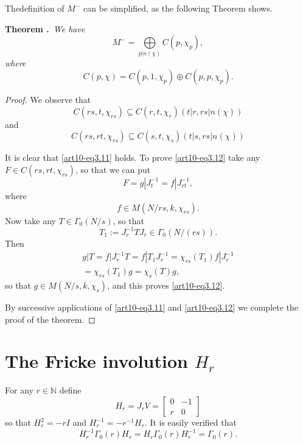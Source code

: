 The\pageoriginale definition of $M^{-}$ can be simplified, as the following Theorem shows.

\medskip
\noindent
{\bf Theorem .\label{art10-thm3.1}}~{\em We have}
\begin{equation}
M^{-}=\bigoplus\limits_{p|n(\chi)}C(p,\chi_{p}),\label{art10-eq3.9}
\end{equation}
{\em where}
\begin{equation}
C(p,\chi)=C(p,1,\chi_{p})\oplus C(p,p,\chi_{p}).\label{art10-eq3.10}
\end{equation}

\begin{proof}
We observe that
\begin{equation}
C(rs,t,\chi_{rs})\subseteq C(r,t,\chi_{r})(t|r,rs|n(\chi))\label{art10-eq3.11}
\end{equation}
and
\begin{equation}
C(rs,rt,\chi_{rs})\subseteq C(s,t,\chi_{s})(t|s,rs|n(\chi))\label{art10-eq3.12}
\end{equation}

It is clear that \eqref{art10-eq3.11} holds. To prove \eqref{art10-eq3.12} take any $F\in C(rs,rt,\chi_{rs})$, so that we can put
$$
F=g|J^{-1}_{t}=f|J^{-1}_{rt},
$$
where
$$
f\in M(N/rs,k,\chi_{rs}).
$$
Now take any $T\in\Gamma_{0}(N/s)$, so that
$$
T_{1}:=J^{-1}_{r}TJ_{r}\in \Gamma_{0}(N/(rs)).
$$
Then
\begin{gather*}
g|T=f|J^{-1}_{r}T=f|T_{1}J^{-1}_{r}=\chi_{rs}(T_{1})f|J^{-1}_{r}\\
=\chi_{rs}(T_{1})g=\chi_{s}(T)g,
\end{gather*}
so that $g\in M(N/s,k,\chi_{s})$, and this proves \eqref{art10-eq3.12}.

By successive applications of \eqref{art10-eq3.11} and \eqref{art10-eq3.12} we complete the proof of the theorem.
\end{proof}

\section{The Fricke involution $H_{r}$}\label{art10-sec4}
For any $r\in \mathbb{N}$ define
\setcounter{equation}{0}
\begin{equation}
H_{r}=J_{r}V=
\begin{bmatrix}
0 & -1\\
r & 0
\end{bmatrix}\label{art10-eq4.1}
\end{equation}
so that $H^{2}_{r}=-rI$ and $H^{-1}_{r}=-r^{-1}H_{r}$. It is easily verified that
\begin{equation}
H^{-1}_{r}\Gamma_{0}(r)H_{r}=H_{r}\Gamma_{0}(r)H^{-1}_{r}=\Gamma_{0}(r).\label{art10-eq4.2}
\end{equation}

